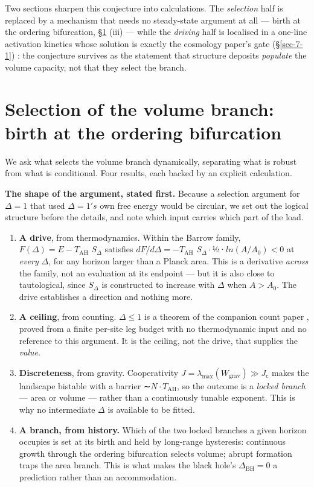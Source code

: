 \documentclass[aps,prd,preprint,nofootinbib,superscriptaddress]{revtex4-2}
\providecommand{\tightlist}{\setlength{\itemsep}{0pt}\setlength{\parskip}{0pt}}
\begin{document}
Two sections sharpen this conjecture into calculations. The
\emph{selection} half is replaced by a mechanism that needs no
steady-state argument at all --- birth at the ordering bifurcation,
§\ref{sec-5} (iii) --- while the \emph{driving} half is localised in a
one-line activation kinetics whose solution is exactly the cosmology
paper's gate (§\ref{sec-7-1}) \cite{Pandev:2026cosmology}: the
conjecture survives as the statement that structure deposits
\emph{populate} the volume capacity, not that they select the branch.

\section{Selection of the volume branch: birth at the ordering
bifurcation}\label{sec-5}

We ask what selects the volume branch dynamically, separating what is
robust from what is conditional. Four results, each backed by an
explicit calculation.

\textbf{The shape of the argument, stated first.} Because a selection
argument for \(\Delta  = 1\) that used \(\Delta  = 1's\) own free energy
would be circular, we set out the logical structure before the details,
and note which input carries which part of the load.

\begin{enumerate}
\def\labelenumi{\arabic{enumi}.}
\tightlist
\item
  \textbf{A drive}, from thermodynamics. Within the Barrow family,
  \(F(\Delta ) = E - T_\mathrm{AH}\) \(S_\Delta\) satisfies
  \(dF/d\Delta  = -T_\mathrm{AH}\)
  \(S_\Delta \cdot\)½·\(ln(A/A_{0}) < 0\) at \emph{every} \(\Delta\),
  for any horizon larger than a Planck area. This is a derivative
  \emph{across} the family, not an evaluation at its endpoint --- but it
  is also close to tautological, since \(S_\Delta\) is constructed to
  increase with \(\Delta\) when \(A > A_{0}\). The drive establishes a
  direction and nothing more.
\item
  \textbf{A ceiling}, from counting. \(\Delta  \leq  1\) is a theorem of
  the companion count paper \cite{Pandev:2026count}, proved from a
  finite per-site leg budget with no thermodynamic input and no
  reference to this argument. It is the ceiling, not the drive, that
  supplies the \emph{value}.
\item
  \textbf{Discreteness}, from gravity. Cooperativity
  \(J = \lambda _{\mathrm{max}}(W_{\mathrm{grav}}) \gg  J_{\mathrm{c}}\)
  makes the landscape bistable with a barrier ∼\(N\cdot T_\mathrm{AH}\),
  so the outcome is a \emph{locked branch} --- area or volume --- rather
  than a continuously tunable exponent. This is why no intermediate
  \(\Delta\) is available to be fitted.
\item
  \textbf{A branch, from history.} Which of the two locked branches a
  given horizon occupies is set at its birth and held by long-range
  hysteresis: continuous growth through the ordering bifurcation selects
  volume; abrupt formation traps the area branch. This is what makes the
  black hole's \(\Delta _\mathrm{BH} = 0\) a prediction rather than an
  accommodation.
\end{enumerate}
\end{document}

